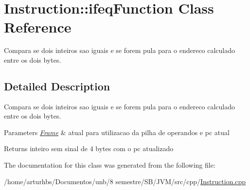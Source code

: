 \hypertarget{classInstruction_1_1ifeqFunction}{}\section{Instruction\+:\+:ifeq\+Function Class Reference}
\label{classInstruction_1_1ifeqFunction}


Compara se dois inteiros sao iguais e se forem pula para o endereco calculado entre os dois bytes.  




\subsection{Detailed Description}
Compara se dois inteiros sao iguais e se forem pula para o endereco calculado entre os dois bytes. 


\begin{DoxyParams}{Parameters}
{\em \hyperlink{classFrame}{Frame}} & atual para utilizacao da pilha de operandos e pc atual \\
\hline
\end{DoxyParams}
\begin{DoxyReturn}{Returns}
inteiro sem sinal de 4 bytes com o pc atualizado 
\end{DoxyReturn}


The documentation for this class was generated from the following file\+:\begin{DoxyCompactItemize}
\item 
/home/arturhbs/\+Documentos/unb/8 semestre/\+S\+B/\+J\+V\+M/src/cpp/\hyperlink{Instruction_8cpp}{Instruction.\+cpp}\end{DoxyCompactItemize}
